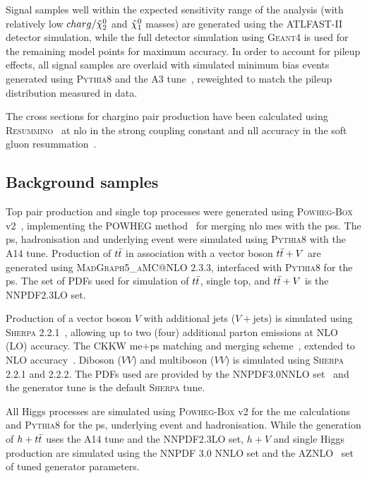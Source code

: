 Signal samples well within the expected sensitivity range of the analysis (with relatively low $charg/\tilde{\chi}_2^0$ and $\tilde{\chi}_1^0$ masses) are generated using the \textsc{ATLFAST-II} detector simulation, while the full detector simulation using \textsc{Geant4} is used for the remaining model points for maximum accuracy. In order to account for pileup effects, all signal samples are overlaid with simulated minimum bias events generated using \textsc{Pythia8} and the A3 tune~\cite{ATL-PHYS-PUB-2016-017}, reweighted to match the pileup distribution measured in data. 

The cross sections for chargino pair production have been calculated using \textsc{Resummino}~\cite{Fuks:2013vua} at \gls{nlo} in the strong coupling constant and \gls{nll} accuracy in the soft gluon resummation~\cite{Fiaschi:2018hgm,Fuks:2012qx}.

\subsection{Background samples}

Top pair production and single top processes were generated using \textsc{Powheg-Box} v2~\cite{PowhegBox:2010xd}, implementing the \textsc{POWHEG} method~\cite{Powheg1,Powheg2} for merging \gls{nlo} \glspl{me} with the \glspl{ps}. The \gls{ps}, hadronisation and underlying event were simulated using \textsc{Pythia8} with the A14 tune. Production of $t\bar{t}$ in association with a vector boson $t\bar{t}+V$ are generated using \textsc{MadGraph5\_aMC@NLO} 2.3.3, interfaced with \textsc{Pythia8} for the \gls{ps}. The set of \glspl{PDF} used for simulation of $t\bar{t}$, single top, and $t\bar{t}+V$ is the NNPDF2.3LO set.

Production of a vector boson $V$ with additional jets ($V+\mathrm{jets}$) is simulated using \textsc{Sherpa} 2.2.1~\cite{Gleisberg:2008ta,Bothmann:2019yzt}, allowing up to two (four) additional parton emissions at NLO (LO) accuracy. The CKKW \gls{me}+\gls{ps} matching and merging scheme~\cite{Hoeche:2009rj,Catani:2001cc}, extended to NLO accuracy~\cite{Hoeche:2012yf}. Diboson ($VV$) and multiboson ($VV$) is simulated using \textsc{Sherpa} 2.2.1 and 2.2.2. The \glspl{PDF} used are provided by the NNPDF3.0NNLO set~\cite{Ball:2014uwa} and the generator tune is the default \textsc{Sherpa} tune.

All Higgs processes are simulated using \textsc{Powheg-Box} v2 for the \gls{me} calculations and \textsc{Pythia8} for the \gls{ps}, underlying event and hadronisation. While the generation of $h+t\bar{t}$ uses the A14 tune and the NNPDF2.3LO set, $h+V$ and single Higgs production are simulated using the NNPDF 3.0 NNLO set and the AZNLO~\cite{ATL-PHYS-PUB-2013-017} set of tuned generator parameters.

